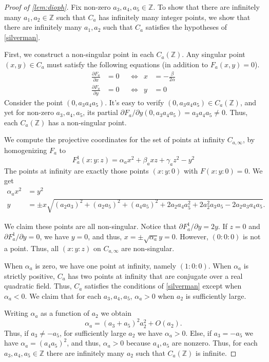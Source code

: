 \documentclass[11 pt]{amsart}
\begin{document}
\begin{proof}[Proof of \cref{lem:dioph}]
	Fix non-zero $a_{3}, a_{4}, a_{5} \in \mathbb{Z}$. To show that there are infinitely many $a_{1}, a_{2} \in \mathbb{Z}$ such that $C_{a}$ has infinitely many integer points, we show that there are infinitely many $a_{1}, a_{2}$ such that $C_{a}$ satisfies the hypotheses of \cref{silverman}.

First, we construct a non-singular point in each $C_{a}(\mathbb Z)$. Any singular point $(x, y) \in C_{a}$ must satisfy the following equations (in addition to $F_{a}(x, y) = 0$).
\begin{align*}
	\frac{\partial F_{a}}{\partial x} & = 0  && \iff & x & = -\frac{\beta}{2 \alpha} \\
	\frac{\partial F_{a}}{\partial y} & = 0 & & \iff & y & =0
\end{align*}
Consider the point $(0, a_{3} a_{4} a_{5})$. It's easy to verify $(0, a_{3} a_{4} a_{5}) \in C_{a}(\mathbb Z)$, and yet for non-zero  $a_{3}, a_{4}, a_{5}$, its partial ${\partial F_{a}}/{\partial y}(0, a_{3} a_{4} a_{5}) = a_{3} a_{4} a_{5} \neq 0$. Thus, each $C_{a}(\mathbb Z)$ has a non-singular point.

We compute the projective coordinates for the set of points at infinity \(C_{a,\infty}\), by homogenizing $F_{a}$ to
\[
	F_a^{1}(x : y : z) = \alpha_{a} x^{2} + \beta_{a} x z + \gamma_{a} z^{2} - y^{2}
\]
The points at infinity are exactly those points $(x : y : 0)$ with $F(x : y : 0) = 0$. We get
\begin{align*}
	\alpha_a x^2 & = y^2 \\
	y & = \pm x\sqrt{(a_2a_3)^2+(a_2a_5)^2+(a_4a_5)^2+2a_2a_4a_5^2+2a_2^2a_3a_5-2a_2a_3a_4a_5}.
\end{align*}

We claim these points are all non-singular. Notice that $\partial F^{1}_{a} / \partial y = 2y$. If $z = 0$ and $\partial F^{1}_{a} / \partial y = 0$, we have $y = 0$, and thus, $x = \pm \sqrt{\alpha_{a}} y = 0$. However, $(0 : 0 : 0)$ is not a point. Thus, all $(x : y : z)$ on $C_{a, \infty}$ are non-singular.

When \(\alpha_a\) is zero, we have one point at infinity, namely \((1 : 0 : 0)\). When \(\alpha_a\) is strictly positive, $C_a$ has two points at infinity that are conjugate over a real quadratic field. Thus,  \(C_a\) satisfies the conditions of \cref{silverman} except when $\alpha_a < 0$. We claim that for each $a_{3}, a_{4}, a_{5}$, $\alpha_{a} > 0$ when $a_{2}$ is sufficiently large.

Writing $\alpha_a$ as a function of $a_{2}$ we obtain
\[
	\alpha_a = (a_{3} + a_{5})^{2} a_{2}^{2} + O(a_{2}).
\]
Thus, if $a_{3} \neq - a_{5}$, for sufficiently large $a_{2}$ we have $\alpha_a > 0$. Else, if $a_{3} = -a_{5}$ we have $\alpha_a = (a_{4} a_{5})^{2}$, and thus, $\alpha_a > 0$ because \(a_4, a_5\) are nonzero. Thus, for each $a_{3}, a_{4}, a_{5} \in \mathbb{Z}$ there are infinitely many $a_{2}$ such that $C_{a}(\mathbb{Z})$ is infinite.
\end{proof}
\end{document}
